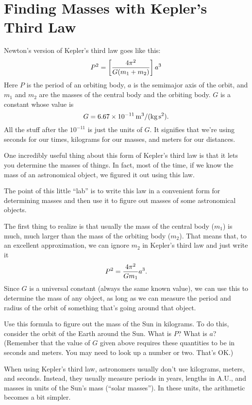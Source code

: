 \section{Finding Masses with Kepler's Third Law}

\makelabheader

Newton's version of Kepler's third law goes like this:
$$
P^2=\left[4\pi^2\over G(m_1+m_2)\right]a^3
$$
Here $P$ is the period of an orbiting body, $a$ is the semimajor axis
of the orbit, and $m_1$ and $m_2$ are the masses of the central body
and the orbiting body.  $G$ is a constant whose value is
$$
G=6.67\times 10^{-11}\,{\rm m^3/(kg\,s^2)}.
$$
All the stuff after the $10^{-11}$ is just the units of $G$.
It signifies that we're using seconds for our times, kilograms for
our masses, and meters for our distances.

One incredibly useful thing about this form of Kepler's third law
is that it lets you determine the masses of things.  In fact, most
of the time, if we know the mass of an astronomical object, we figured
it out using this law.

The point of this little ``lab'' is to write this law in a convenient
form for determining masses and then use it to figure out 
masses of some astronomical objects.

The first thing to realize is that usually the mass of the central
body ($m_1$) is much, much larger than the mass of the orbiting
body ($m_2$).  That means that, to an excellent approximation, we can
ignore $m_2$ in Kepler's third law and just write it
$$
P^2={4\pi^2\over Gm_1}a^3.
$$
Since $G$ is a universal constant (always the same known value), 
we can use this to determine the mass of any object, as long as we 
can measure the period and radius of the orbit of something
that's going around that object.

Use this formula to figure out the mass of the Sun in kilograms.  To do this,
consider the orbit of the Earth around the Sun.  What is $P$?
What is $a$?  (Remember that the value of $G$ given above requires
these quantities to be in seconds and meters. You may need to look
up a number or two. That's OK.)

\answerspace{2in}

When using Kepler's third law, astronomers usually don't use kilograms,
meters, and seconds.  Instead, they usually measure periods in years,
lengths in A.U., and masses in units of the Sun's mass (``solar masses'').
In these units, the arithmetic becomes a bit simpler.

